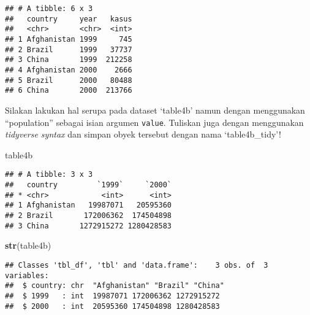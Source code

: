 \documentclass[]{article}
\newenvironment{Shaded}{\begin{snugshade}}{\end{snugshade}}
\newcommand{\CommentTok}[1]{\textcolor[rgb]{0.56,0.35,0.01}{\textit{#1}}}
\newcommand{\DataTypeTok}[1]{\textcolor[rgb]{0.13,0.29,0.53}{#1}}
\newcommand{\DecValTok}[1]{\textcolor[rgb]{0.00,0.00,0.81}{#1}}
\newcommand{\KeywordTok}[1]{\textcolor[rgb]{0.13,0.29,0.53}{\textbf{#1}}}
\newcommand{\NormalTok}[1]{#1}
\newcommand{\OperatorTok}[1]{\textcolor[rgb]{0.81,0.36,0.00}{\textbf{#1}}}
\newcommand{\StringTok}[1]{\textcolor[rgb]{0.31,0.60,0.02}{#1}}
\begin{document}
\begin{verbatim}
## # A tibble: 6 x 3
##   country     year   kasus
##   <chr>       <chr>  <int>
## 1 Afghanistan 1999     745
## 2 Brazil      1999   37737
## 3 China       1999  212258
## 4 Afghanistan 2000    2666
## 5 Brazil      2000   80488
## 6 China       2000  213766
\end{verbatim}

Silakan lakukan hal serupa pada dataset `table4b' namun dengan
menggunakan ``population'' sebagai isian argumen \texttt{value}.
Tuliskan juga dengan menggunakan \emph{tidyverse syntax} dan simpan
obyek tersebut dengan nama `table4b\_tidy'!

\begin{Shaded}
\begin{Highlighting}[]
\NormalTok{table4b}
\end{Highlighting}
\end{Shaded}

\begin{verbatim}
## # A tibble: 3 x 3
##   country         `1999`     `2000`
## * <chr>            <int>      <int>
## 1 Afghanistan   19987071   20595360
## 2 Brazil       172006362  174504898
## 3 China       1272915272 1280428583
\end{verbatim}

\begin{Shaded}
\begin{Highlighting}[]
\KeywordTok{str}\NormalTok{(table4b)}
\end{Highlighting}
\end{Shaded}

\begin{verbatim}
## Classes 'tbl_df', 'tbl' and 'data.frame':    3 obs. of  3 variables:
##  $ country: chr  "Afghanistan" "Brazil" "China"
##  $ 1999   : int  19987071 172006362 1272915272
##  $ 2000   : int  20595360 174504898 1280428583
\end{verbatim}

\begin{Shaded}
\end{Shaded}
\end{document}
